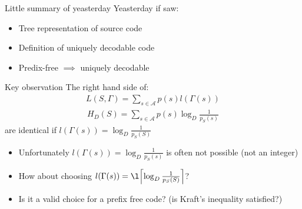 
\begin{parag}{Little summary of yeasterday}
    Yeasterday if saw:
    \begin{itemize}
       \item Tree representation of source code
       \item  Definition of uniquely decodable code
       \item Predix-free $\implies$ uniquely decodable
    \end{itemize}
    
\end{parag}


\begin{parag}{Key observation}
    The right hand side of:
    \begin{align*}
        L(S, \Gamma) = \sum_{s \in \mathcal{A}} p(s) l ( \Gamma (s))
    \end{align*}
    \begin{align*}
        H_D(S) = \sum_{s \in \mathcal{A}} p(s) \log_D \frac{1}{p_S(s)}
    \end{align*}
    are identical if $l( \Gamma (s)) = \log_D \frac{1}{p_S\left(S\right)}$
    \begin{itemize}
        \item Unfortunately $l( \Gamma (s)) = \log_D \frac{1}{p_S(s)}$ is often not possible (not an integer)
        \item How about choosing $l\left(\Gamma\left(s\right)\right) =\l\left\lceil \log_D \frac{1}{p_S\left(S\right)} \right\rceil $?
        \item Is it a valid choice for a prefix free code? (is Kraft's inequality satisfied?)
    \end{itemize}
    

\end{parag}
